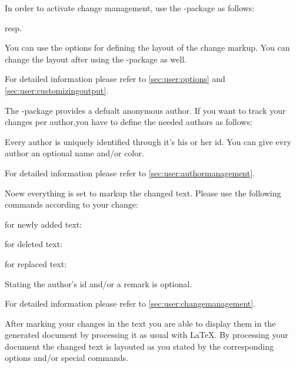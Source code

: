 
In order to activate change management, use the -package as follows:


resp.


You can use the options for defining the layout of the change markup.
You can change the layout after using the -package as well.

For detailed information please refer to \autoref{sec:user:options} and \autoref{sec:user:customizingoutput}.



The -package provides a defualt anonymous author.
If you want to track your changes per author,you have to define the needed authors as follows:


Every author is uniquely identified through it's his or her id.
You can give evry author an optional name and/or color.

For detailed information please refer to \autoref{sec:user:authormanagement}.



Noew everything is set to markup the changed text.
Please use the following commands according to your change:

for newly added text:\\

for deleted text:\\

for replaced text:\\

Stating the author's id and/or a remark is optional.

For detailed information please refer to \autoref{sec:user:changemanagement}.



After marking your changes in the text you are able to display them in the generated document by processing it as usual with \LaTeX.
By processing your document the changed text is layouted as you stated by the corresponding options and/or special commands.

